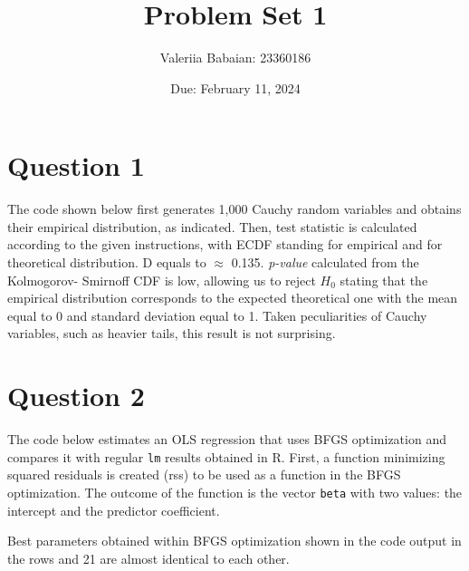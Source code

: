\documentclass[12pt,letterpaper]{article}
\title{Problem Set 1}
\date{Due: February 11, 2024}
\author{Valeriia Babaian: 23360186}
\begin{document}
	\maketitle

	\vspace{.25cm}
\section*{Question 1} 
\vspace{.25cm}

The code shown below first generates 1,000 Cauchy random variables and obtains their empirical distribution, as indicated. Then, test statistic is calculated according to the given instructions, with ECDF standing for empirical and   for theoretical distribution. D equals to $\approx$ 0.135. \textit{p-value} calculated from the Kolmogorov- Smirnoff CDF is low, allowing us to reject $H_0$ stating that the empirical distribution corresponds to the expected theoretical one with the mean equal to 0 and standard deviation equal to 1. Taken peculiarities of Cauchy variables, such as heavier tails, this result is not surprising.


  

\vspace{3in}

\section*{Question 2}

The code below estimates an OLS regression that uses BFGS optimization and compares it with regular \texttt{lm} results obtained in R. First, a function minimizing squared residuals is created (rss) to be used as a function in the BFGS optimization. The outcome of the function is the vector \texttt{beta} with two values: the intercept and the predictor coefficient. 


  


Best parameters obtained within BFGS optimization shown in the code output in the rows  and 21 are almost identical to each other. 
\end{document}
